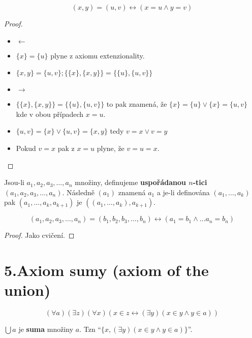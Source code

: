 \begin{lemma}
	$$
	(x,y) = (u,v) \leftrightarrow (x = u \land y = v)
	$$
\end{lemma}

\begin{proof}
	\begin{itemize}
		\item $\leftarrow$
		\item $\{x\} = \{u\}$ plyne z axiomu extenzionality.
		\item $\{x,y\} = \{u,v\}; \{\{x\},\{x,y\}\} = \{\{u\},\{u,v\}\}$
		\item $\rightarrow$
		\item $\{\{x\},\{x,y\}\} = \{\{u\},\{u,v\}\}$ to pak znamená, že $\{x\} = \{u\} \lor \{x\} = \{u,v\}$ kde v obou případech $x=u$.
		\item $\{u,v\} = \{x\} \lor \{u,v\} = \{x,y\}$ tedy $v = x \lor v = y$
		\item Pokud $v=x$ pak z $x = u$ plyne, že $v=u=x$.
	\end{itemize}
\end{proof}

\begin{definice}
	Jsou-li $a_{1},a_{2},a_{3}, \dots ,a_{n}$ množiny, definujeme \textbf{uspořádanou $n$-tici} $(a_{1},a_{2},a_{3}, \dots ,a_{n})$. Následně $(a_{1})$ znamená $a_{1}$ a je-li definována $(a_{1}, \dots ,a_{k})$ pak $(a_{1}, \dots ,a_{k}, a_{k+1})$ je $((a_{1}, \dots ,a_{k}), a_{k+1})$.
\end{definice}

\begin{lemma}
	$$
	(a_{1},a_{2},a_{3}, \dots ,a_{n}) = (b_{1},b_{2},b_{3}, \dots ,b_{n}) \leftrightarrow (a_{1} = b_{1} \land \dots a_{n} = b_{n})
	$$
\end{lemma}

\begin{proof}
	Jako cvičení.
\end{proof}

\section{5.Axiom sumy (axiom of the union)}

$$
(\forall a)(\exists z)(\forall x)(x \in z \leftrightarrow (\exists y)(x \in y \land y \in a))
$$

\begin{definice}
	$\bigcup a$ je \textbf{suma} množiny $a$. Tzn “$\{x, (\exists y)(x \in y \land y \in a)\}$”.
\end{definice}

